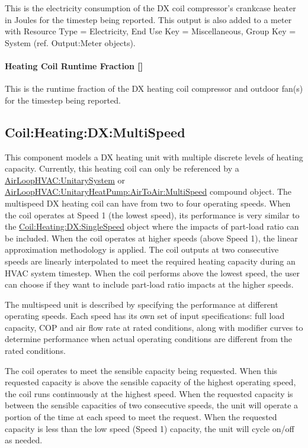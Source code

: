 This is the electricity consumption of the DX coil compressor's crankcase heater in Joules for the timestep being reported. This output is also added to a meter with Resource Type = Electricity, End Use Key = Miscellaneous, Group Key = System (ref. Output:Meter objects).

\paragraph{Heating Coil Runtime Fraction {[]}}

This is the runtime fraction of the DX heating coil compressor and outdoor fan(s) for the timestep being reported.

\subsection{Coil:Heating:DX:MultiSpeed}\label{coilheatingdxmultispeed}

This component models a DX heating unit with multiple discrete levels of heating capacity. Currently, this heating coil can only be referenced by a \hyperref[airloophvacunitarysystem]{AirLoopHVAC:UnitarySystem} or \hyperref[airloophvacunitaryheatpumpairtoairmultispeed]{AirLoopHVAC:UnitaryHeatPump:AirToAir:MultiSpeed} compound object. The multispeed DX heating coil can have from two to four operating speeds. When the coil operates at Speed 1 (the lowest speed), its performance is very similar to the \hyperref[coilheatingdxsinglespeed]{Coil:Heating:DX:SingleSpeed} object where the impacts of part-load ratio can be included. When the coil operates at higher speeds (above Speed 1), the linear approximation methodology is applied. The coil outputs at two consecutive speeds are linearly interpolated to meet the required heating capacity during an HVAC system timestep. When the coil performs above the lowest speed, the user can choose if they want to include part-load ratio impacts at the higher speeds.

The multispeed unit is described by specifying the performance at different operating speeds. Each speed has its own set of input specifications: full load capacity, COP and air flow rate at rated conditions, along with modifier curves to determine performance when actual operating conditions are different from the rated conditions.

The coil operates to meet the sensible capacity being requested. When this requested capacity is above the sensible capacity of the highest operating speed, the coil runs continuously at the highest speed. When the requested capacity is between the sensible capacities of two consecutive speeds, the unit will operate a portion of the time at each speed to meet the request. When the requested capacity is less than the low speed (Speed 1) capacity, the unit will cycle on/off as needed.

